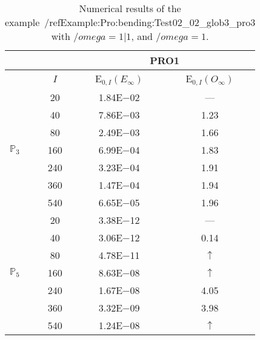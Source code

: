 \begin{table}[H]
\caption{Numerical results of the example~/ref{Example:Pro:bending:Test02_02_glob3_pro3} with $/omega=1|1$, and $/omega=1$.}
\setlength{\tabcolsep}{5pt}
\centering
\begin{tabular}{@{}l c c c@{}}
\toprule
 &  & \multicolumn{2}{c}{PRO1}\\
\midrule
 & $I$ & E$_{0,I}(E_{\infty})$ & E$_{0,I}(O_{\infty})$\\
\midrule
\multirow{7}{*}{$\mathbb{P}_{3}$}
 & 20 & 1.84E$-$02 & ---\\
 & 40 & 7.86E$-$03 & 1.23\\
 & 80 & 2.49E$-$03 & 1.66\\
 & 160 & 6.99E$-$04 & 1.83\\
 & 240 & 3.23E$-$04 & 1.91\\
 & 360 & 1.47E$-$04 & 1.94\\
 & 540 & 6.65E$-$05 & 1.96\\
\midrule
\multirow{7}{*}{$\mathbb{P}_{5}$}
 & 20 & 3.38E$-$12 & ---\\
 & 40 & 3.06E$-$12 & 0.14\\
 & 80 & 4.78E$-$11 & $\uparrow$\\
 & 160 & 8.63E$-$08 & $\uparrow$\\
 & 240 & 1.67E$-$08 & 4.05\\
 & 360 & 3.32E$-$09 & 3.98\\
 & 540 & 1.24E$-$08 & $\uparrow$\\
\bottomrule
\end{tabular}
\label{Table:PRO:test_02_02_test9_pro3}
\end{table}
